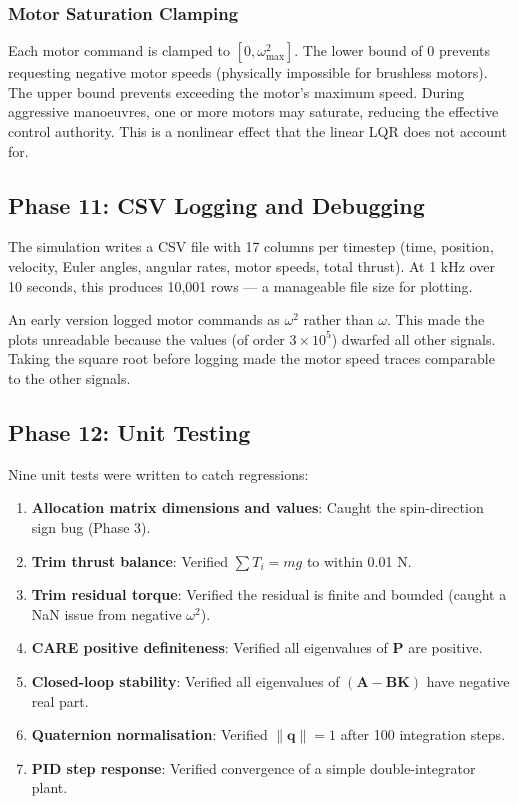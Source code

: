 \documentclass[12pt, a4paper]{article}
\newcommand{\bq}{\bm{q}}
\newcommand{\bK}{\bm{K}}
\newcommand{\bA}{\bm{A}}
\newcommand{\bB}{\bm{B}}
\newcommand{\bP}{\bm{P}}
\begin{document}
\subsubsection{Motor Saturation Clamping}

Each motor command is clamped to $[0, \omega_{\max}^2]$.  The lower bound of 0 prevents requesting negative motor speeds (physically impossible for brushless motors).  The upper bound prevents exceeding the motor's maximum speed.  During aggressive manoeuvres, one or more motors may saturate, reducing the effective control authority.  This is a nonlinear effect that the linear LQR does not account for.

\subsection{Phase 11: CSV Logging and Debugging}

The simulation writes a CSV file with 17 columns per timestep (time, position, velocity, Euler angles, angular rates, motor speeds, total thrust).  At 1 kHz over 10 seconds, this produces 10{,}001 rows --- a manageable file size for plotting.

An early version logged motor commands as $\omega^2$ rather than $\omega$.  This made the plots unreadable because the values (of order $3 \times 10^5$) dwarfed all other signals.  Taking the square root before logging made the motor speed traces comparable to the other signals.

\subsection{Phase 12: Unit Testing}

Nine unit tests were written to catch regressions:
\begin{enumerate}
    \item \textbf{Allocation matrix dimensions and values}: Caught the spin-direction sign bug (Phase 3).
    \item \textbf{Trim thrust balance}: Verified $\sum T_i = mg$ to within 0.01 N.
    \item \textbf{Trim residual torque}: Verified the residual is finite and bounded (caught a NaN issue from negative $\omega^2$).
    \item \textbf{CARE positive definiteness}: Verified all eigenvalues of $\bP$ are positive.
    \item \textbf{Closed-loop stability}: Verified all eigenvalues of $(\bA - \bB\bK)$ have negative real part.
    \item \textbf{Quaternion normalisation}: Verified $\|\bq\| = 1$ after 100 integration steps.
    \item \textbf{PID step response}: Verified convergence of a simple double-integrator plant.
\end{enumerate}
\end{document}
